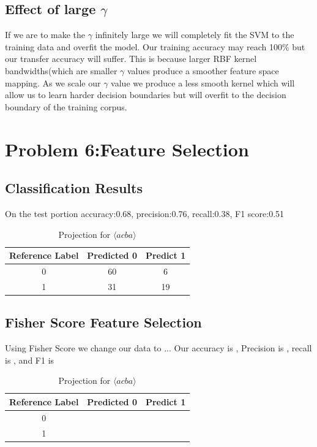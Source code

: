 \documentclass[11pt]{article}
\begin{document}
\subsection{Effect of large $\gamma$}
If we are to make the $\gamma$ infinitely large we will completely fit the SVM to the training data and overfit the model. Our training accuracy may reach 100\% but our transfer accuracy will suffer. This is because larger RBF kernel bandwidths(which are smaller $\gamma$ values produce a smoother feature space mapping. As we scale our $\gamma$ value we produce a less smooth kernel which will allow us to learn harder decision boundaries but will overfit to the decision boundary of the training corpus. 
\section{Problem 6:Feature Selection}
\subsection{Classification Results}
On the test portion accuracy:0.68, precision:0.76, recall:0.38, F1 score:0.51
\begin{table}[]
    \centering
    \begin{tabular}{|c|c|c|} \hline
       Reference Label  & Predicted 0 & Predict 1   \\ \hline
       0 & 60 & 6 \\ \hline
       1 & 31 & 19 \\ \hline
    \end{tabular}
    \caption{Projection for $\langle acba\rangle$}
    \label{tab:Accuracy}
\end{table}
\subsection{Fisher Score Feature Selection}
Using Fisher Score we change our data to ...
Our accuracy is , Precision is , recall is , and F1 is 
\begin{table}[]
    \centering
    \begin{tabular}{|c|c|c|} \hline
       Reference Label  & Predicted 0 & Predict 1   \\ \hline
       0 & & \\ \hline
       1 & & \\ \hline
    \end{tabular}
    \caption{Projection for $\langle acba\rangle$}
    \label{tab:Accuracy}
\end{table}
\end{document}
